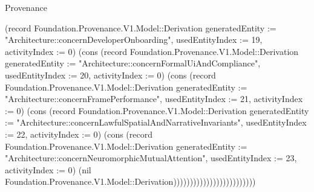 \begin{lexlean}{Provenance}
\begin{semanticmodule}
{(record Foundation.Provenance.V1.Model::Derivation {generatedEntity := "Architecture::concernDeveloperOnboarding", usedEntityIndex := 19, activityIndex := 0}) (cons (record Foundation.Provenance.V1.Model::Derivation {generatedEntity := "Architecture::concernFormalUiAndCompliance", usedEntityIndex := 20, activityIndex := 0}) (cons (record Foundation.Provenance.V1.Model::Derivation {generatedEntity := "Architecture::concernFramePerformance", usedEntityIndex := 21, activityIndex := 0}) (cons (record Foundation.Provenance.V1.Model::Derivation {generatedEntity := "Architecture::concernLawfulSpatialAndNarrativeInvariants", usedEntityIndex := 22, activityIndex := 0}) (cons (record Foundation.Provenance.V1.Model::Derivation {generatedEntity := "Architecture::concernNeuromorphicMutualAttention", usedEntityIndex := 23, activityIndex := 0}) (nil Foundation.Provenance.V1.Model::Derivation)))))))))))))))))))))))))
}


\end{semanticmodule}
\end{lexlean}
